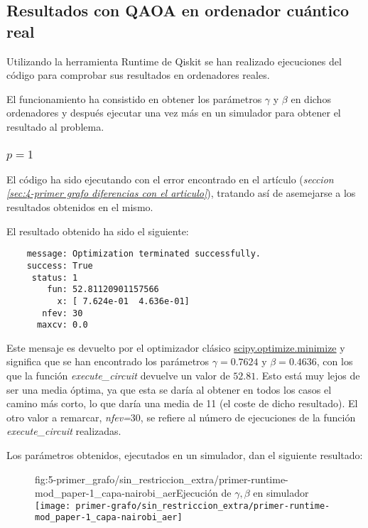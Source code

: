 \subsection{Resultados con QAOA en ordenador cuántico real}
Utilizando la herramienta Runtime de Qiskit se han realizado ejecuciones del código para comprobar sus resultados en ordenadores reales.

El funcionamiento ha consistido en obtener los parámetros $\gamma$ y $\beta$ en dichos ordenadores y después ejecutar una vez más en un simulador para obtener el resultado al problema.

\subsubsection{\(p = 1\)}
El código ha sido ejecutando con el error encontrado en el artículo (\textit{seccion \ref{sec:4-primer grafo diferencias con el articulo}}), tratando así de asemejarse a los resultados obtenidos en el mismo.

El resultado obtenido ha sido el siguiente:

\begin{verbatim}
    message: Optimization terminated successfully.
    success: True
     status: 1
        fun: 52.81120901157566
          x: [ 7.624e-01  4.636e-01]
       nfev: 30
      maxcv: 0.0
\end{verbatim}

Este mensaje es devuelto por el optimizador clásico \href{https://docs.scipy.org/doc/scipy/reference/generated/scipy.optimize.minimize.html}{scipy.optimize.minimize}
y significa que se han encontrado los parámetros $\gamma = 0.7624$ y $\beta = 0.4636$, con los que la función \textit{execute\_circuit} devuelve un valor de $52.81$. Esto está muy lejos de ser una media óptima, ya que esta se daría al obtener en todos los casos el camino más corto, lo que daría una media de 11 (el coste de dicho resultado).
El otro valor a remarcar, \textit{nfev=$30$}, se refiere al número de ejecuciones de la función \textit{execute\_circuit} realizadas.

Los parámetros obtenidos, ejecutados en un simulador, dan el siguiente resultado:
\begin{figure}[htbp]{fig:5-primer_grafo/sin_restriccion_extra/primer-runtime-mod_paper-1_capa-nairobi_aer}{Ejecución de $\gamma, \beta$ en simulador}
  \centering
  \texttt{[image: primer-grafo/sin\_restriccion\_extra/primer-runtime-mod\_paper-1\_capa-nairobi\_aer]}
\end{figure}

